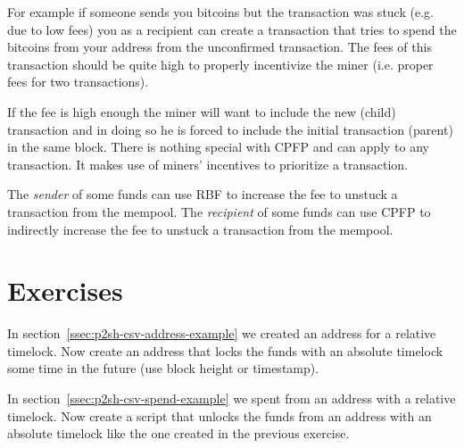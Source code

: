 For example if someone sends you bitcoins but the transaction was stuck (e.g. due to low fees) you as a recipient can create a transaction that tries to spend the bitcoins from your address from the unconfirmed transaction. The fees of this transaction should be quite high to properly incentivize the miner (i.e. proper fees for two transactions).

If the fee is high enough the miner will want to include the new (child) transaction and in doing so he is forced to include the initial transaction (parent) in the same block.
There is nothing special with CPFP and can apply to any transaction. It makes use of miners' incentives to prioritize a transaction.

\begin{note}
The \emph{sender} of some funds can use RBF to increase the fee to unstuck a transaction from the mempool. The \emph{recipient} of some funds can use CPFP to indirectly increase the fee to unstuck a transaction from the mempool.
\end{note}


\section{Exercises}

\begin{exercise}
In section~\ref{ssec:p2sh-csv-address-example} we created an address for a relative timelock. Now create an address that locks the funds with an absolute timelock some time in the future (use block height or timestamp).
\end{exercise}

\begin{exercise}
In section~\ref{ssec:p2sh-csv-spend-example} we spent from an address with a relative timelock. Now create a script that unlocks the funds from an address with an absolute timelock like the one created in the previous exercise.
\end{exercise}






